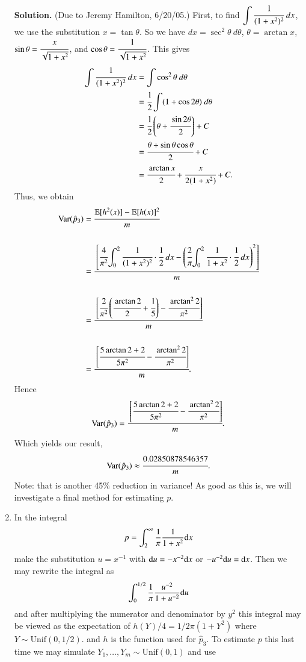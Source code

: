 \documentclass[captions=tableheading]{scrbook}
\begin{document}
\begin{enumerate}
   \textbf{Solution.} (Due to Jeremy Hamilton, 6/20/05.)
   First, to find ${\displaystyle \int\cfrac{1}{(1+x^{2})^{2}}\ dx}$, we use the substitution $x=\tan{\theta}$. So we have $dx=\sec^{2}{\theta}\ d\theta$, $\theta=\arctan{x}$, ${\displaystyle \sin{\theta}=\cfrac{x}{\sqrt{1+x^{2}}}}$, and ${\displaystyle \cos{\theta}=\cfrac{1}{\sqrt{1+x^{2}}}}$. This gives 
   \begin{align*}
   \int\cfrac{1}{(1+x^{2})^{2}}\ dx & =\int\cos^{2}{\theta}\ d\theta\\
   & =\cfrac{1}{2}\int(1+\cos{2\theta})\ d\theta\\
   & =\cfrac{1}{2}\left(\theta+\cfrac{\sin{2\theta}}{2}\right)+C\\
   & =\cfrac{\theta+\sin{\theta}\cos{\theta}}{2}+C\\
   & =\cfrac{\arctan{x}}{2}+\cfrac{x}{2(1+x^{2})}+C.
   \end{align*}
   Thus, we obtain
   \begin{align*}
   \text{Var}(\hat{p}_{3}) & =\cfrac{\mathbb{E}[h^{2}(x)]-\mathbb{E}[h(x)]^{2}}{m}\\
   \\ & =\cfrac{\left[\cfrac{4}{\pi^{2}}{\displaystyle \int_{0}^{2}\cfrac{1}{(1+x^{2})^{2}}\cdot\cfrac{1}{2}\ dx}-\left(\cfrac{2}{\pi}{\displaystyle \int_{0}^{2}\cfrac{1}{1+x^{2}}\cdot\cfrac{1}{2}\ dx}\right)^{2}\right]}{m}\\
   \\ & =\cfrac{\left[\cfrac{2}{\pi^{2}}\left(\cfrac{\arctan{2}}{2}+\cfrac{1}{5}\right)-\cfrac{\arctan^{2}{2}}{\pi^{2}}\right]}{m}\\
   \\ & =\cfrac{\left[\cfrac{5\arctan{2}+2}{5\pi^{2}}-\cfrac{\arctan^{2}{2}}{\pi^{2}}\right]}{m}.
   \end{align*}
   Hence
   \[
   \text{Var}(\hat{p}_{3})=\cfrac{\left[\cfrac{5\arctan{2}+2}{5\pi^{2}}-\cfrac{\arctan^{2}{2}}{\pi^{2}}\right]}{m}.
   \]
   Which yields our result,
   \[
   \text{Var}(\hat{p}_{3})\approx\cfrac{0.02850878546357}{m}.
   \]
   Note: that is another 45\% reduction in variance! As good as this is, we will investigate a final method for estimating $p$.
\item In the integral 
  \[
  p=\int_{2}^{\infty}\frac{1}{\pi}\frac{1}{1+x^{2}}\mathrm{d} x
  \]
  make the substitution $u=x^{-1}$ with $\mathrm{d} u=-x^{-2}\mathrm{d} x$ or $-u^{-2}\mathrm{d} u=\mathrm{d} x$.
  Then we may rewrite the integral as 
  \[
  \int_{0}^{1/2}\frac{1}{\pi}\frac{u^{-2}}{1+u^{-2}}\mathrm{d} u
  \]
  and after multiplying the numerator and denominator by $y^{2}$ this integral may be viewed as the expectation of $h(Y)/4=1/2\pi(1+Y^{2})$ where $Y\sim\mathrm{Unif}(0,1/2)$. and $h$ is the function used for $\hat{p}_{3}$. To estimate $p$ this last time we may simulate $Y_{1},\ldots,Y_{m}\sim\mathrm{Unif}(0,1)$ and use

\end{enumerate}
\end{document}
